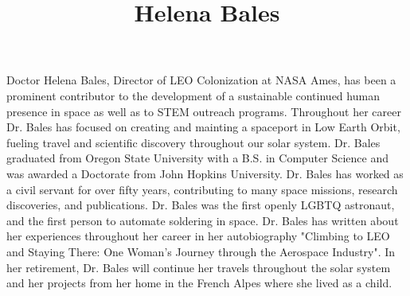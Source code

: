 \documentclass[letterpaper,10pt]{article}
\title{Helena Bales}
\begin{document}
\maketitle

Doctor Helena Bales, Director of LEO Colonization at NASA Ames, has been a prominent contributor to the development of a sustainable continued human presence in space as well as to STEM outreach programs. Throughout her career Dr. Bales has focused on creating and mainting a spaceport in Low Earth Orbit, fueling travel and scientific discovery throughout our solar system. Dr. Bales graduated from Oregon State University with a B.S. in Computer Science and was awarded a Doctorate from John Hopkins University. Dr. Bales has worked as a civil servant for over fifty years, contributing to many space missions, research discoveries, and publications. Dr. Bales was the first openly LGBTQ astronaut, and the first person to automate soldering in space. Dr. Bales has written about her experiences throughout her career in her autobiography "Climbing to LEO and Staying There: One Woman's Journey through the Aerospace Industry". In her retirement, Dr. Bales will continue her travels throughout the solar system and her projects from her home in the French Alpes where she lived as a child.
\end{document}
